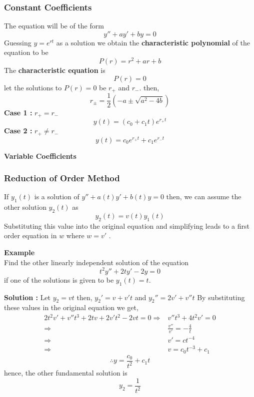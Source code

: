 \documentclass[10pt]{article}
\begin{document}
            \subsubsection{Constant Coefficients}
                The equation will be of the form $$y'' + ay' + by = 0$$
                Guessing $y = e^{rt}$ as a solution we obtain the \textbf{characteristic polynomial} of the equation to be 
                $$P(r) = r^2 + ar +b$$
                The \textbf{characteristic equation} is $$P(r) = 0$$
                let the solutions to $P(r) = 0$ be $r_+$ and $r_-$. then,
                $$r_{\pm} = \frac{1}{2}(-a \pm \sqrt{a^2-4b})$$
                \textbf{Case 1 :} $r_{+} = r_{-}$
                $$y(t) = (c_0 + c_1 t)e^{r_+t}$$
                \textbf{Case 2 :} $r_+ \ne r_-$
                $$y(t) = c_0e^{r_+t} + c_1e^{r_-t}$$
                \begin{center}
                    \Large{\textbf{Variable Coefficients}}
                \end{center}
            \subsubsection{Reduction of Order Method}
                If $y_1(t)$ is a solution of $y'' + a(t)y' + b(t)y = 0$ then, we can assume the other solution  $y_2(t)$ as  $$y_2(t) = v(t)y_1(t)$$
                Substituting this value into the original equation and simplifying leads to a first order equation in $w$ where $w = v'$ . 
                
                \textbf{Example}\\
                Find the other linearly independent solution of the equation 
                $$t^2y'' + 2ty' - 2y = 0$$
                if one of the solutions is given to be $y_1(t) = t$.
                
                \textbf{Solution :}
                Let  $y_2 = vt$
                then, $y_2' = v + v't$ and $y_2'' = 2v' + v''t$
                By substituting these values in the original equation we get,
                \begin{align*}
                2t^2v' + v''t^3 + 2tv + 2v't^2 - 2vt = 0 
                \Rightarrow &v''t^3 + 4t^2v'= 0\\
                \Rightarrow &\frac{v''}{v'} = -\frac{4}{t}\\
                \Rightarrow &v' = ct^{-4}\\
                \Rightarrow &v = c_0t^{-3} + c_1
                \end{align*}
                $$\therefore y = \frac{c_0}{t^2} + c_1t$$
                hence, the other fundamental solution is $$y_2 = \frac{1}{t^2}$$
\end{document}
